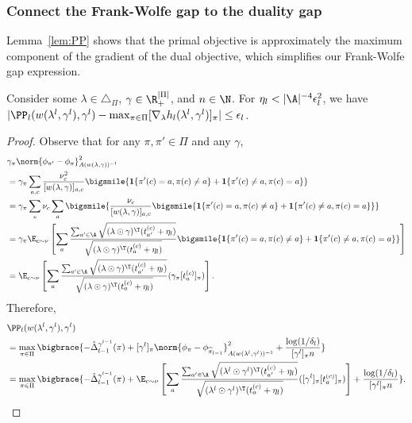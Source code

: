 \documentclass{article}
\newcommand{\pill}{\widehat{\pi}_{l-1}}
\newcommand{\1}{\mathbf{1}}
\begin{document}
\subsubsection{Connect the Frank-Wolfe gap to the duality gap}

Lemma~\ref{lem:PP} shows that the primal objective is approximately the maximum component of the gradient of the dual objective, which simplifies our Frank-Wolfe gap expression. 

\begin{lemma}\label{lem:PP}
Consider some $\lambda\in\triangle_\Pi$, $\gamma\in\R_+^{|\Pi|}$, and $n\in\N$. For $\eta_l<|\A|^{-4}\epsilon_l^{2}$, we have $|\PP_l(w(\lambda^{l},\gamma^l),\gamma^l)-\max_{\pi\in\Pi}[\nabla_\lambda h_l(\lambda^{l}, \gamma^l)]_\pi|\leq \epsilon_l$. 
\end{lemma}
\begin{proof}
Observe that for any $\pi,\pi'\in\Pi$ and any $\gamma$, 
{
\small
\begin{align*}
    &\gamma_\pi\norm{\phi_{\pi'}-\phi_\pi}_{A(w(\lambda,\gamma))^{-1}}^2\\
    &=\gamma_\pi\sum_{a,c}\frac{\nu_c^2}{[w(\lambda,\gamma)]_{a,c}}\bigsmile{\1\{\pi'(c)=a,\pi(c)\ne a\}+\1\{\pi'(c)\ne a,\pi(c)=a\}}\\
    &=\gamma_\pi \sum_{c}\nu_c\sum_{a}\bigsmile{\frac{\nu_c}{[w(\lambda,\gamma)]_{a,c}}\bigsmile{\1\{\pi'(c)=a,\pi(c)\ne a\}+\1\{\pi'(c)\ne a,\pi(c)=a\}}}\\
    &= \gamma_\pi\E_{c\sim\nu}\left[\sum_{a}\frac{\sum_{a'\in\A}\sqrt{(\lambda\odot\gamma)^\T (t_{a'}^{(c)}+\eta_l)}}{\sqrt{(\lambda\odot\gamma)^\T (t_{a}^{(c)}+\eta_l)}}\bigsmile{\1\{\pi'(c)=a,\pi(c)\ne a\}+\1\{\pi'(c)\ne a,\pi(c)=a\}}\right]\\
    &= \E_{c\sim\nu}\left[\sum_{a}\frac{\sum_{a'\in\A}\sqrt{(\lambda\odot\gamma)^\T (t_{a'}^{(c)}+\eta_l)}}{\sqrt{(\lambda\odot\gamma)^\T (t_{a}^{(c)}+\eta_l)}}(\gamma_\pi[t_a^{(c)}]_\pi)\right].
\end{align*}
}
Therefore, 
\begin{align*}
    &\PP_l(w(\lambda^{l},\gamma^l),\gamma^l)\\
    &= 
    \max_{\pi\in\Pi}\bigbrace{-\hat{\Delta}_{l-1}^{\gamma^{l-1}}(\pi)+[\gamma^l]_\pi\norm{\phi_{\pi}-\phi_{\pill}}_{A(w(\lambda^{l},\gamma^l))^{-1}}^2+\frac{\log(1/\delta_l)}{[\gamma^l]_\pi n}}\\
    &= \max_{\pi\in\Pi}\bigbrace{-\hat{\Delta}_{l-1}^{\gamma^{l-1}}(\pi)+\E_{c\sim\nu}\left[\sum_{a}\frac{\sum_{a'\in\A}\sqrt{(\lambda^{l}\odot\gamma^l)^\T (t_{a'}^{(c)}+\eta_l)}}{\sqrt{(\lambda^{l}\odot\gamma^l)^\T (t_{a}^{(c)}+\eta_l)}}([\gamma^l]_\pi[t_a^{(c)}]_\pi)\right]+\frac{\log(1/\delta_l)}{[\gamma^l]_\pi n}}.

\end{align*}
\end{proof}
\end{document}
